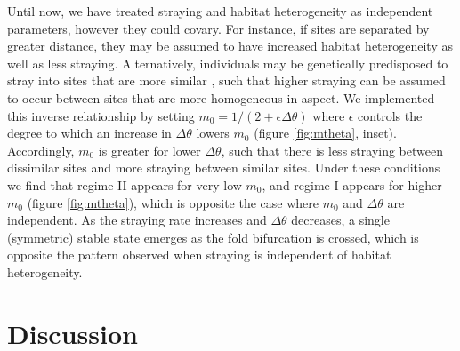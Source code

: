 \documentclass{revtex4}
\begin{document}
Until now, we have treated straying and habitat heterogeneity as independent parameters, however they could covary.
For instance, if sites are separated by greater distance, they may be assumed to have increased habitat heterogeneity as well as less straying.
Alternatively, individuals may be genetically predisposed to stray into sites that are more similar \citep{Peterson:2014gy,Lin:2008kl}, such that higher straying can be assumed to occur between sites that are more homogeneous in aspect.
We implemented this inverse relationship by setting $m_0 = 1/(2+\epsilon\Delta\theta)$ where $\epsilon$ controls the degree to which an increase in $\Delta\theta$ lowers $m_0$ (figure \ref{fig:mtheta}, inset).
Accordingly, $m_0$ is greater for lower $\Delta\theta$, such that there is less straying between dissimilar sites and more straying between similar sites.
Under these conditions we find that regime II appears for very low $m_0$, and regime I appears for higher $m_0$ (figure \ref{fig:mtheta}), which is opposite the case where $m_0$ and $\Delta\theta$ are independent. %
As the straying rate increases and $\Delta\theta$ decreases, a single (symmetric) stable state emerges as the fold bifurcation is crossed, which is opposite the pattern observed when straying is independent of habitat heterogeneity.





\section{Discussion}
\end{document}
